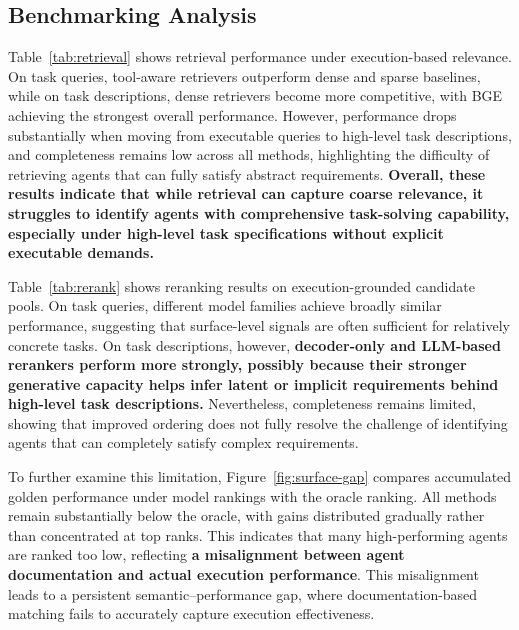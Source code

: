 \documentclass{article} %
\def \TAB {Table}
\def \FIG {Figure}
\begin{document}
\subsection{Benchmarking Analysis}

\TAB~\ref{tab:retrieval} shows retrieval performance under execution-based relevance. On task queries, tool-aware retrievers outperform dense and sparse baselines, while on task descriptions, dense retrievers become more competitive, with BGE achieving the strongest overall performance. However, performance drops substantially when moving from executable queries to high-level task descriptions, and completeness remains low across all methods, highlighting the difficulty of retrieving agents that can fully satisfy abstract requirements. \textbf{Overall, these results indicate that while retrieval can capture coarse relevance, it struggles to identify agents with comprehensive task-solving capability, especially under high-level task specifications without explicit executable demands.}

\TAB~\ref{tab:rerank} shows reranking results on execution-grounded candidate pools. On task queries, different model families achieve broadly similar performance, suggesting that surface-level signals are often sufficient for relatively concrete tasks. On task descriptions, however, \textbf{decoder-only and LLM-based rerankers perform more strongly, possibly because their stronger generative capacity helps infer latent or implicit requirements behind high-level task descriptions.} Nevertheless, completeness remains limited, showing that improved ordering does not fully resolve the challenge of identifying agents that can completely satisfy complex requirements.

To further examine this limitation, \FIG~\ref{fig:surface-gap} compares accumulated golden performance under model rankings with the oracle ranking. All methods remain substantially below the oracle, with gains distributed gradually rather than concentrated at top ranks. This indicates that many high-performing agents are ranked too low, reflecting \textbf{a misalignment between agent documentation and actual execution performance}. This misalignment leads to a persistent semantic–performance gap, where documentation-based matching fails to accurately capture execution effectiveness.
\end{document}
